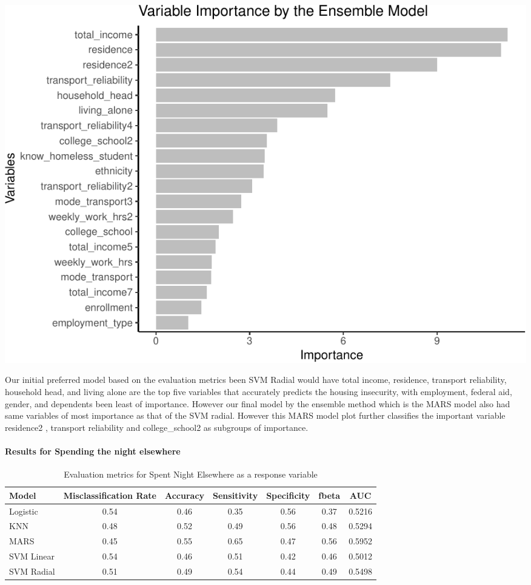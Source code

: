 \documentclass[
  10pt,
]{article}
\begin{document}
\begin{center}\includegraphics{phase2_report_files/figure-latex/unnamed-chunk-12-1} \end{center}

Our initial preferred model based on the evaluation metrics been SVM Radial would have total income, residence, transport reliability, household head, and living alone are the top five variables that accurately predicts the housing insecurity, with employment, federal aid, gender, and dependents been least of importance. However our final model by the ensemble method which is the MARS model also had same variables of most importance as that of the SVM radial. However this MARS model plot further classifies the important variable residence2 , transport reliability and college\_school2 as subgroups of importance.\\

\hypertarget{results-for-spending-the-night-elsewhere}{%
\paragraph{Results for Spending the night elsewhere}\label{results-for-spending-the-night-elsewhere}}

\begin{table}[H]

\caption{\label{tab:unnamed-chunk-13}Evaluation metrics for Spent Night Elsewhere  as a response variable}
\centering
\fontsize{12}{14}\selectfont
\begin{tabular}[t]{lcccccc}
\toprule
Model & Misclassification Rate & Accuracy & Sensitivity & Specificity & fbeta & AUC\\
\midrule
Logistic & 0.54 & 0.46 & 0.35 & 0.56 & 0.37 & 0.5216\\
KNN & 0.48 & 0.52 & 0.49 & 0.56 & 0.48 & 0.5294\\
MARS & 0.45 & 0.55 & 0.65 & 0.47 & 0.56 & 0.5952\\
SVM Linear & 0.54 & 0.46 & 0.51 & 0.42 & 0.46 & 0.5012\\
SVM Radial & 0.51 & 0.49 & 0.54 & 0.44 & 0.49 & 0.5498\\
\bottomrule
\end{tabular}
\end{table}
\end{document}
